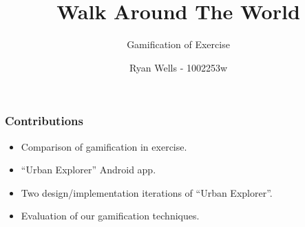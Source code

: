 \documentclass{beamer}
\title{Walk Around The World}
\subtitle{Gamification of Exercise}
\author{Ryan Wells - 1002253w}
\begin{document}
\maketitle
\begin{frame}
  \frametitle{Contributions}
  
  \begin{itemize}
    \item Comparison of gamification in exercise.
    \item ``Urban Explorer'' Android app.
    \item Two design/implementation iterations of ``Urban Explorer''.
    \item Evaluation of our gamification techniques.
  \end{itemize}
\end{frame}
\end{document}
